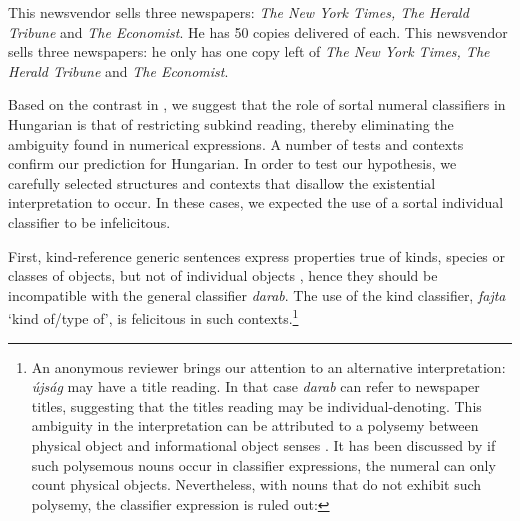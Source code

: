 \documentclass[output=paper]{langscibook}
\begin{document}
\ea \label{schv-nem:ex:9}
\ea \label{schv-nem:ex:9a}
This newsvendor sells three newspapers: \textit{The New York Times, The Herald Tribune} and \textit{The Economist}. He has 50 copies delivered of each.
\ex \label{schv-nem:ex:9b}
This newsvendor sells three newspapers: he only has one copy left of \textit{The New York Times, The Herald Tribune} and \textit{The Economist}.
\z
\z

\noindent Based on the contrast in , we suggest that the role of sortal numeral classifiers in Hungarian is that of restricting subkind reading, thereby eliminating the ambiguity found in numerical expressions. A number of tests and contexts confirm our prediction for Hungarian. In order to test our hypothesis, we carefully selected structures and contexts that disallow the existential interpretation to occur. In these cases, we expected the use of a sortal individual classifier to be infelicitous.

First, kind-reference generic sentences express properties true of kinds, species or classes of objects, but not of individual objects \citep{krifka-etal-95}, hence they should be incompatible with the general classifier \textit{darab}. The use of the kind classifier, \textit{fajta} `kind of/type of', is felicitous in such contexts.\footnote{An anonymous reviewer brings our attention to an alternative interpretation: \textit{újság} may have a title reading. In that case \textit{darab} can refer to newspaper titles, suggesting that the titles reading may be individual-denoting. This ambiguity in the interpretation can be attributed to a polysemy between physical object and informational object senses \citep{puste95, asher-11}. It has been discussed by \citet{schvarcz-wohlmuth-20} if such polysemous  nouns occur in classifier expressions, the numeral can only count physical objects. Nevertheless, with nouns that do not exhibit such polysemy, the classifier expression is ruled out: 

\z} 
\end{document}
